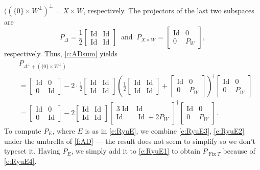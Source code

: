\documentclass[11pt]{article}
\newcommand{\Fix}{\ensuremath{\operatorname{Fix}}}
\newcommand{\Id}{\ensuremath{\operatorname{Id}}}
\theoremstyle{definition}
\providecommand{\Id}{\operatorname{{ Id}}}
\providecommand{\Id}{\operatorname{Id}}
\begin{document}
{$((\{0\}\times W^\perp)^\perp = X\times W$, respectively.
The projectors of the last two subspaces are
\begin{equation*}
P_\Delta =
\frac{1}{2}
\begin{bmatrix}
\Id & \Id \\
\Id & \Id
\end{bmatrix}
\;\;\text{and}\;\;
P_{X\times W} =
\begin{bmatrix}
\Id & 0 \\
0 & P_W
\end{bmatrix},
\end{equation*}
respectively.
Thus, \cref{c:ADsum} yields
\begin{subequations}
\label{e:RyuE2}
\begin{align}
&P_{\Delta^\perp+(\{0\}\times W^\perp)}\\
&= 
\begin{bmatrix}
\Id & 0 \\
0 & \Id
\end{bmatrix}
- 2\cdot \frac{1}{2}
\begin{bmatrix}
\Id & \Id \\
\Id & \Id
\end{bmatrix}
\left(
\frac{1}{2}
\begin{bmatrix}
\Id & \Id \\
\Id & \Id
\end{bmatrix}
+
\begin{bmatrix}
\Id & 0 \\
0 & P_W
\end{bmatrix}
\right)^\dagger
\begin{bmatrix}
\Id & 0 \\
0 & P_W
\end{bmatrix}\\
&= 
\begin{bmatrix}
\Id & 0 \\
0 & \Id
\end{bmatrix}
- 2
\begin{bmatrix}
\Id & \Id \\
\Id & \Id
\end{bmatrix}
\begin{bmatrix}
{3}\Id & \Id \\
\Id & \Id+2P_W
\end{bmatrix}^\dagger
\begin{bmatrix}
\Id & 0 \\
0 & P_W
\end{bmatrix}. 
\end{align}
\end{subequations}
To compute $P_E$, where $E$ is as in \cref{e:RyuE}, 
we combine \cref{e:RyuE3}, \cref{e:RyuE2} under the umbrella
of \cref{f:AD} --- the result does not seem to simplify so 
we don't typeset it. 
Having $P_E$, we simply add it to \cref{e:RyuE1} to obtain 
$P_{\Fix T}$ because of \cref{e:RyuE4}. 






}
\end{document}
